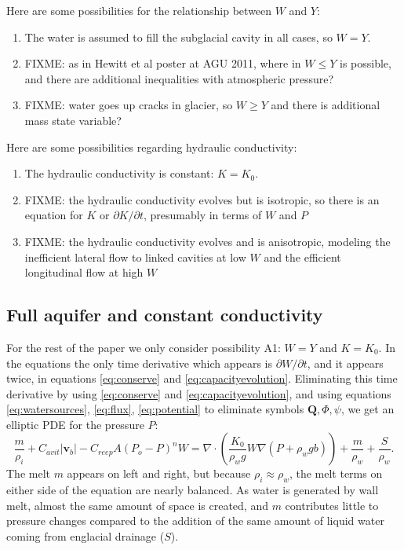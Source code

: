 \documentclass[11pt]{amsart}
\newcommand{\bQ}{\mathbf{Q}}
\newcommand{\bv}{\mathbf{v}}
\newcommand{\Cavit}{C_{avit}}
\newcommand{\Creep}{C_{reep}}
\begin{document}
Here are some possibilities for the relationship between $W$ and $Y$:
\renewcommand{\labelenumi}{\Alph{enumi}.}
\begin{enumerate}
\item The water is assumed to fill the subglacial cavity in all cases, so $W=Y$.
\item FIXME: as in Hewitt et al poster at AGU 2011, where in $W\le Y$ is possible, and there are additional inequalities with atmospheric pressure?
\item FIXME: water goes up cracks in glacier, so $W\ge Y$ and there is additional mass state variable?
\end{enumerate}
Here are some possibilities regarding hydraulic conductivity:
\renewcommand{\labelenumi}{\arabic{enumi}.}
\begin{enumerate}
\item The hydraulic conductivity is constant: $K=K_0$.
\item FIXME:  the hydraulic conductivity evolves but is isotropic, so there is an equation for $K$ or $\partial K/\partial t$, presumably in terms of $W$ and $P$
\item FIXME:  the hydraulic conductivity evolves and is anisotropic, modeling the inefficient lateral flow to linked cavities at low $W$ and the efficient longitudinal flow at high $W$
\end{enumerate}


\subsection*{Full aquifer and constant conductivity}  For the rest of the paper we only consider possibility A1: $W=Y$ and $K=K_0$.  In the equations the only time derivative which appears is $\partial W/\partial t$, and it appears twice, in equations \eqref{eq:conserve} and \eqref{eq:capacityevolution}.  Eliminating this time derivative by using \eqref{eq:conserve} and \eqref{eq:capacityevolution}, and using equations \eqref{eq:watersources}, \eqref{eq:flux}, \eqref{eq:potential} to eliminate symbols $\bQ,\Phi,\psi$, we get an elliptic PDE for the pressure $P$:
\begin{equation}\label{eq:pressureearly}
\frac{m}{\rho_i} + \Cavit |\bv_b| - \Creep A (P_o - P)^n W = \nabla \cdot \left(\frac{K_0}{\rho_w g} W \nabla (P + \rho_w g b)\right) + \frac{m}{\rho_w} + \frac{S}{\rho_w}.
\end{equation}
The melt $m$ appears on left and right, but because $\rho_i\approx \rho_w$, the melt terms on either side of the equation are nearly balanced.  As water is generated by wall melt, almost the same amount of space is created, and $m$ contributes little to pressure changes compared to the addition of the same amount of liquid water coming from englacial drainage ($S$).
\end{document}
